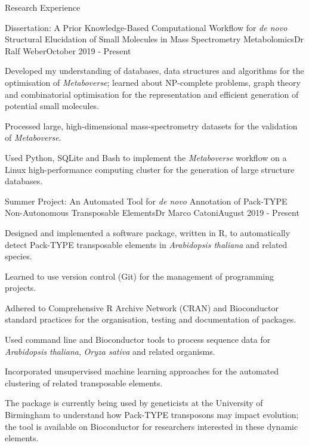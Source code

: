 \documentclass{resume}
\begin{document}
\begin{rSection}{Research Experience}

\begin{rSubsection}{Dissertation: A Prior Knowledge-Based Computational Workflow for \textit{de novo} Structural Elucidation of Small Molecules in Mass Spectrometry Metabolomics}{}{Dr Ralf Weber}{October 2019 - Present}

\item Developed my understanding of databases, data structures and algorithms for the optimisation of \textit{Metaboverse}; learned about NP-complete problems, graph theory and combinatorial optimisation for the representation and efficient generation of potential small molecules. 
\item Processed large, high-dimensional mass-spectrometry datasets for the validation of \textit{Metaboverse}. 
\item Used Python, SQLite and Bash to implement the \textit{Metaboverse} workflow  on a Linux high-performance computing cluster for the generation of large structure databases. 
\end{rSubsection}

\begin{rSubsection}{Summer Project: An Automated Tool for \textit{de novo} Annotation of Pack-TYPE Non-Autonomous Transposable Elements}{}{Dr Marco Catoni}{August 2019 - Present}

\item Designed and implemented a software package, written in R, to automatically detect Pack-TYPE transposable elements in \textit{Arabidopsis thaliana} and related species. 
\item Learned to use version control (Git) for the management of programming projects.
\item Adhered to Comprehensive R Archive Network (CRAN) and Bioconductor standard practices for the organisation, testing and documentation of packages.
\item Used command line and Bioconductor tools to process sequence data for \textit{Arabidopsis thaliana}, \textit{Oryza sativa} and related organisms.
\item Incorporated unsupervised machine learning approaches for the automated clustering of related transposable elements.
\item The package is currently being used by geneticists at the University of Birmingham to understand how Pack-TYPE transposons may impact evolution; the tool is available on Bioconductor for researchers interested in these dynamic elements.
\end{rSubsection}


\end{rSection}
\end{document}
